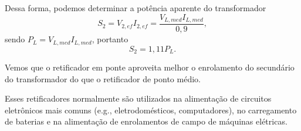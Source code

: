 Dessa forma, podemos determinar a potência aparente do transformador \[
    S_2 = V_{2,ef}{I_{2,ef}} = \frac{V_{L,med} {I_{L,med}}}{0,9}
,\] sendo $P_{L} = V_{L,med}I_{L,med}$, portanto \[
    S_2 = 1,11 P_L
.\] 

Vemos que o retificador em ponte aproveita melhor o enrolamento do secundário do transformador do que o retificador de ponto médio.

Esses retificadores normalmente são utilizados na alimentação de circuitos eletrônicos mais comuns (e.g., eletrodomésticos, computadores), no carregamento de baterias e na alimentação de enrolamentos de campo de máquinas elétricas. 

